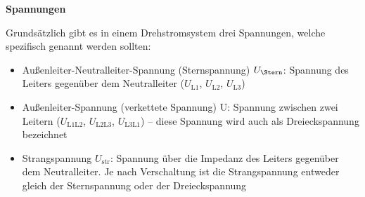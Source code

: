 \begin{frame}


    \textbf{Spannungen}

    Grundsätzlich gibt es in einem Drehstromsystem drei Spannungen, welche spezifisch genannt werden sollten:

    \begin{itemize}
        \item<2-> Außenleiter-Neutralleiter-Spannung (Sternspannung) $U_\Stern$: Spannung des Leiters gegenüber dem Neutralleiter ($U_{\mathrm{L1}}$, $U_{\mathrm{L2}}$, $U_{\mathrm{L3}}$)
        \item<3-> Außenleiter-Spannung (verkettete Spannung) U: Spannung zwischen zwei Leitern ($U_{\mathrm{L1L2}}$, $U_{\mathrm{L2L3}}$, $U_{\mathrm{L3L1}}$) -- diese Spannung wird auch als Dreieckspannung bezeichnet
        \item<4-> Strangspannung $U_{\mathrm{str}}$: Spannung über die Impedanz des Leiters gegenüber dem Neutralleiter. Je nach Verschaltung ist die Strangspannung entweder gleich der Sternspannung oder der Dreieckspannung
    \end{itemize}

\end{frame}


